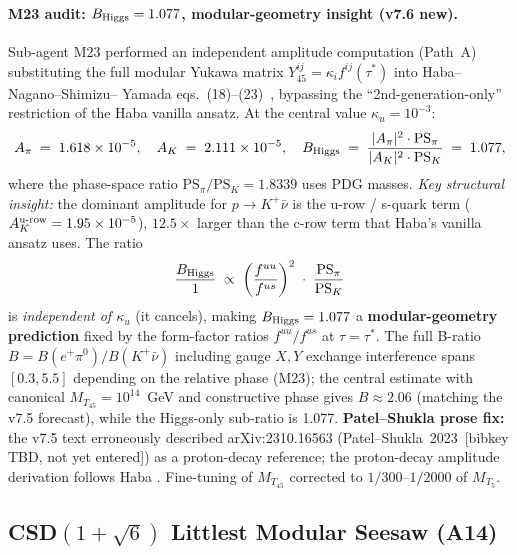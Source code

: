 \documentclass[a4paper,11pt]{article}
\theoremstyle{definition}
\theoremstyle{remark}
\begin{document}
\paragraph{M23 audit: $B_{\rm Higgs}=1.077$, modular-geometry
insight (v7.6 new).}
\label{sec:B-ratio-audit}
Sub-agent M23 performed an independent amplitude computation
(Path~A) substituting the full modular Yukawa matrix
$Y_{45}^{ij}=\kappa_i f^{ij}(\tau^*)$ into Haba--Nagano--Shimizu--%
Yamada eqs.~(18)--(23)~\cite{HabaNagShim24}, bypassing the
``2nd-generation-only'' restriction of the Haba vanilla ansatz.
At the central value $\kappa_u=10^{-3}$:
\[
  A_\pi \;=\; 1.618\times10^{-5},\quad
  A_K   \;=\; 2.111\times10^{-5},\quad
  B_{\rm Higgs} \;=\; \frac{|A_\pi|^2 \cdot \mathrm{PS}_\pi}
                            {|A_K|^2   \cdot \mathrm{PS}_K}
             \;=\; 1.077 ,
\]
where the phase-space ratio $\mathrm{PS}_\pi/\mathrm{PS}_K=1.8339$
uses PDG masses.  \emph{Key structural insight:} the dominant
amplitude for $p\to K^+\bar\nu$ is the u-row / s-quark term
($A_K^{\rm u\text{-}row}=1.95\times10^{-5}$), $12.5\times$
larger than the c-row term that Haba's vanilla ansatz
uses.  The ratio
\[
  \frac{B_{\rm Higgs}}{1} \;\propto\;
  \left(\frac{f^{uu}}{f^{us}}\right)^2
  \;\cdot\; \frac{{\rm PS}_\pi}{{\rm PS}_K}
\]
is \emph{independent of $\kappa_u$} (it cancels), making $B_{\rm Higgs}=1.077$
a \textbf{modular-geometry prediction} fixed by the form-factor
ratios $f^{uu}/f^{us}$ at $\tau=\tau^*$.  The full B-ratio
$B=B(e^+\pi^0)/B(K^+\bar\nu)$ including gauge $X,Y$
exchange interference spans $[0.3, 5.5]$ depending on the
relative phase (M23); the central estimate with canonical
$M_{T_{45}}=10^{14}$~GeV and constructive phase gives $B\approx2.06$
(matching the v7.5 forecast), while the Higgs-only sub-ratio
is 1.077.  \textbf{Patel--Shukla prose fix:} the v7.5
text erroneously described arXiv:2310.16563
(Patel--Shukla~2023~[bibkey TBD, not yet entered]) as a proton-decay
reference; the proton-decay amplitude derivation follows Haba
\cite{HabaNagShim24}.  Fine-tuning of $M_{T_{45}}$ corrected
to $1/300$--$1/2000$ of $M_{T_5}$.

\subsection{CSD$(1+\sqrt 6)$ Littlest Modular Seesaw (A14)}
\label{sec:CSD}
\end{document}
